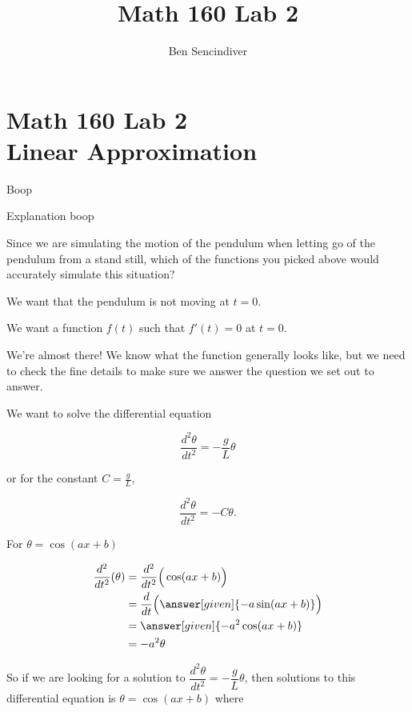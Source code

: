 \documentclass[handout,nooutcomes]{ximera}
\title{Math 160 Lab 2}
\author{Ben Sencindiver} %
\begin{document}
\section{Math 160 Lab 2 \\ Linear Approximation}

\begin{example}
Boop
\begin{explanation}
Explanation boop


\begin{question}
Since we are simulating the motion of the pendulum when letting go of the pendulum from
a stand still, which of the functions you picked above would accurately simulate this situation?
\begin{selectAll}
\end{selectAll}
\begin{hint}
We want that the pendulum is not moving at $t=0$.
\end{hint}
\begin{hint}
We want a function $f(t)$ such that $f'(t) = 0$ at $t=0$.
\end{hint}
\end{question}

We're almost there! We know what the function generally looks like, but we
need to check the fine details to make sure we answer the question we set out to answer.

We want to solve the differential equation

\[
\dfrac{d^2 \theta}{d t^2}  = -\dfrac{g}{L} \theta
\]

or for the constant $C=\frac{g}{L}$,

\[
\dfrac{d^2 \theta}{d t^2}  = -C\theta.
\]

For $\theta = \cos(ax+b)$

\begin{equation*}
\begin{split}
    \dfrac{d^2}{d t^2}(\theta) &= \dfrac{d^2}{d t^2}\Big(\cos(a x + b)\Big)\\
    &= \dfrac{d}{d t} \Big( \answer[given]{- a \sin(a x+b)}\Big)\\
    &= \answer[given]{-a^2 \cos(a x+b)}\\
    &= -a^2 \theta 
\end{split}
\end{equation*}

\begin{question}
So if we are looking for a solution to $\dfrac{d^2 \theta}{d t^2}  = -\dfrac{g}{L} \theta$,
then solutions to this differential equation is $\theta = \cos(ax+b)$ where


\end{question}
\end{explanation}
\end{example}
\end{document}
